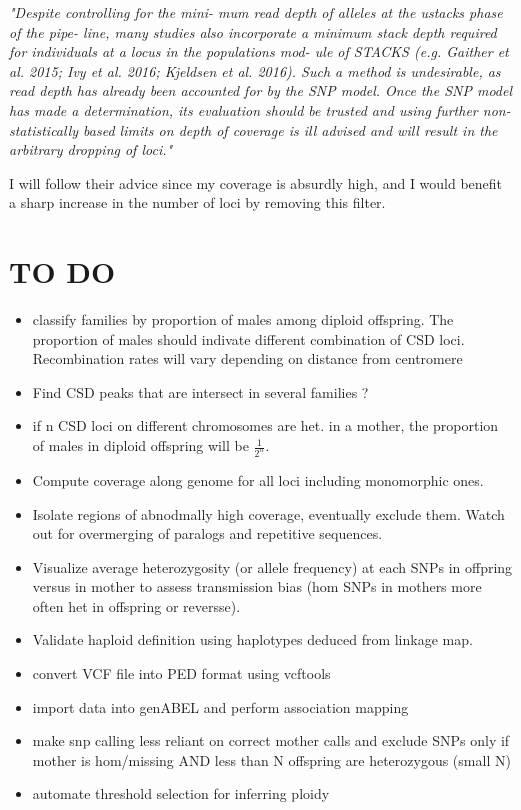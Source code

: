 \documentclass[10pt,a4paper]{report}
\begin{document}
\textit{"Despite controlling for the mini-
mum read depth of alleles at the ustacks phase of the pipe-
line, many studies also incorporate a minimum stack depth
required for individuals at a locus in the populations mod-
ule of STACKS (e.g. Gaither et al. 2015; Ivy et al. 2016; Kjeldsen
et al. 2016). Such a method is undesirable, as read depth has
already been accounted for by the SNP model. Once the SNP
model has made a determination, its evaluation should be
trusted and using further non-statistically based limits on
depth of coverage is ill advised and will result in the arbitrary
dropping of loci."\\}

I will follow their advice since my coverage is absurdly high, and I would benefit a sharp increase in the number of loci by removing this filter. 

\FloatBarrier
\section{TO DO}
\begin{itemize}
\item classify families by proportion of males among diploid offspring. The proportion of males should indivate different combination of CSD loci. Recombination rates will vary depending on distance from centromere
\item Find CSD peaks that are intersect in several families ?
\item if n CSD loci on different chromosomes are het. in a mother, the proportion of males in diploid offspring will be $\frac{1}{2^n}$. 
\item Compute coverage along genome for all loci including monomorphic ones.
\item Isolate regions of abnodmally high coverage, eventually exclude them. Watch out for overmerging of paralogs and repetitive sequences.
\item Visualize average heterozygosity (or allele frequency) at each SNPs in offpring versus in mother to assess transmission bias (hom SNPs in mothers more often het in offspring or reversse). 
\item Validate haploid definition using haplotypes deduced from linkage map.
\item convert VCF file into PED format using vcftools
\item import data into genABEL and perform association mapping
\item make snp calling less reliant on correct mother calls and exclude SNPs only if mother is hom/missing AND less than N offspring are heterozygous (small N)
\item automate threshold selection for inferring ploidy
\end{itemize}
\end{document}

